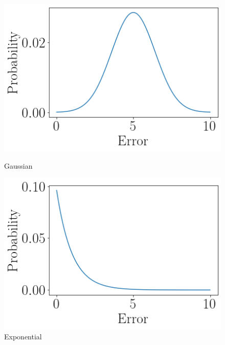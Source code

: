 \begin{figure}[ht]
  \begin{minipage}[b]{0.5\linewidth}
    \centering
    \includegraphics[width=\linewidth]{./img/distributions/normal.png}
    \caption{Gaussian}
    \vspace{4ex}
    \label{n_5_2_hist}
  \end{minipage}%
  \begin{minipage}[b]{0.5\linewidth}
    \centering
    \includegraphics[width=\linewidth]{./img/distributions/exponential.png}
    \caption{Exponential}
    \vspace{4ex}
  \end{minipage}
  \begin{minipage}[b]{0.5\linewidth}
    \centering

\end{minipage}
\end{figure}
